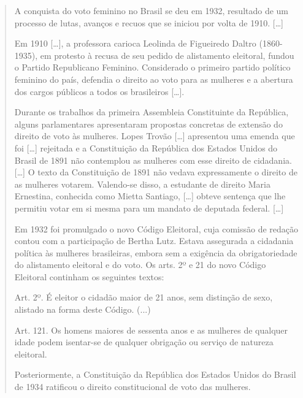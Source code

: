 \begin{quote}
A conquista do voto feminino no Brasil se deu em 1932, resultado de um
processo de lutas, avanços e recuos que se iniciou por volta de 1910. {[}\ldots{}{]}

Em 1910 {[}\ldots{}{]}, a professora carioca Leolinda de Figueiredo Daltro
(1860-1935), em protesto à recusa de seu pedido de alistamento
eleitoral, fundou o Partido Republicano Feminino. Considerado o primeiro
partido político feminino do país, defendia o direito ao voto para as
mulheres e a abertura dos cargos públicos a todos os brasileiros {[}\ldots{}{]}.

Durante os trabalhos da primeira Assembleia Constituinte da República,
alguns parlamentares apresentaram propostas concretas de extensão do
direito de voto às mulheres. Lopes Trovão {[}\ldots{}{]}
 apresentou uma emenda que foi
{[}\ldots{}{]} rejeitada e a Constituição da República dos Estados Unidos do
Brasil de 1891 não contemplou as mulheres com esse direito de cidadania. {[}\ldots{}{]}
O texto da Constituição de 1891 não vedava expressamente o
direito de as mulheres votarem. Valendo-se disso, a estudante de direito
Maria Ernestina, conhecida como Mietta Santiago, {[}\ldots{}{]} obteve sentença
que lhe permitiu votar em si mesma para um mandato de deputada federal. {[}\ldots{}{]}

Em 1932 foi promulgado o novo Código Eleitoral, cuja comissão de
redação contou com a participação de Bertha Lutz. Estava assegurada a
cidadania política às mulheres brasileiras, embora sem a exigência da
obrigatoriedade do alistamento eleitoral e do voto. Os arts. 2º e 21 do
novo Código Eleitoral continham os seguintes textos:

Art. 2º. É eleitor o cidadão maior de 21 anos, sem distinção de sexo,
alistado na forma deste Código. (...)

Art. 121. Os homens maiores de sessenta anos e as mulheres de qualquer
idade podem isentar-se de qualquer obrigação ou serviço de natureza
eleitoral.

Posteriormente, a Constituição da República dos Estados Unidos do Brasil
de 1934 ratificou o direito constitucional de voto das mulheres.

\end{quote}


